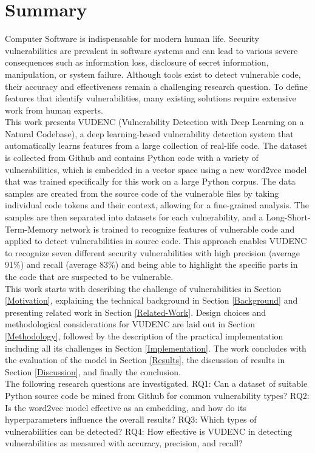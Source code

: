 \documentclass[
a4paper,
pagesize,
pdftex,
12pt,
twoside, %
BCOR=5mm, %
ngerman,
fleqn,
final,
]{scrartcl}
\begin{document}
	\section{Summary}
	Computer Software is indispensable for modern human life. Security vulnerabilities are prevalent in software systems and can lead to various severe consequences such as information loss, disclosure of secret information, manipulation, or system failure. Although tools exist to detect vulnerable code, their accuracy and effectiveness remain a challenging research question. To define features that identify vulnerabilities, many existing solutions require extensive work from human experts.\\ 
	This work presents VUDENC (Vulnerability Detection with Deep Learning on a Natural Codebase), a deep learning-based vulnerability detection system that automatically learns features from a large collection of real-life code. The dataset is collected from Github and contains Python code with a variety of vulnerabilities, which is embedded in a vector space using a new word2vec model that was trained specifically for this work on a large Python corpus. The data samples are created from the source code of the vulnerable files by taking individual code tokens and their context, allowing for a fine-grained analysis. The samples are then separated into datasets for each vulnerability, and a Long-Short-Term-Memory network is trained to recognize features of vulnerable code and applied to detect vulnerabilities in source code. This approach enables VUDENC to recognize seven different security vulnerabilities with high precision (average 91\%) and recall (average 83\%) and being able to highlight the specific parts in the code that are suspected to be vulnerable.\\	
	This work starts with describing the challenge of vulnerabilities in Section \ref{Motivation}, explaining the technical background in Section \ref{Background} and presenting related work in Section \ref{Related-Work}. Design choices and methodological considerations for VUDENC are laid out in Section \ref{Methodology}, followed by the description of the practical implementation including all its challenges in Section \ref{Implementation}. The work concludes with the evaluation of the model in Section \ref{Results}, the discussion of results in Section \ref{Discussion}, and finally the conclusion.\\	
	The following research questions are investigated. RQ1: Can a dataset of suitable Python source code be mined from Github for common vulnerability types? RQ2: Is the word2vec model effective as an embedding, and how do its hyperparameters influence the overall results? RQ3: Which types of vulnerabilities can be detected? RQ4: How effective is VUDENC in detecting vulnerabilities as measured with accuracy, precision, and recall? \\
	
\end{document}
